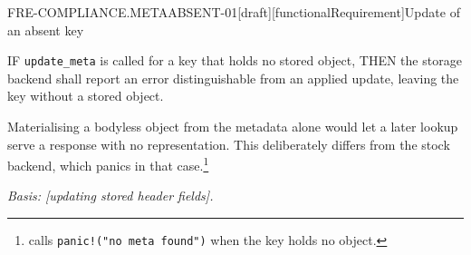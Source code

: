 \begin{requirement}{FRE-COMPLIANCE.METAABSENT-01}[draft][functionalRequirement]{Update of an absent key}


  IF \texttt{update\_meta} is called for a key that holds no stored object,
  THEN the storage backend shall report an error distinguishable from an
  applied update, leaving the key without a stored object.

  Materialising a bodyless object from the metadata alone would let a later
  lookup serve a response with no representation. This deliberately differs
  from the stock backend, which panics in that
  case.\footnote{
  calls \texttt{panic!("no meta found")} when the key holds no object.}

  \textit{Basis: [updating stored header fields].}



\end{requirement}

